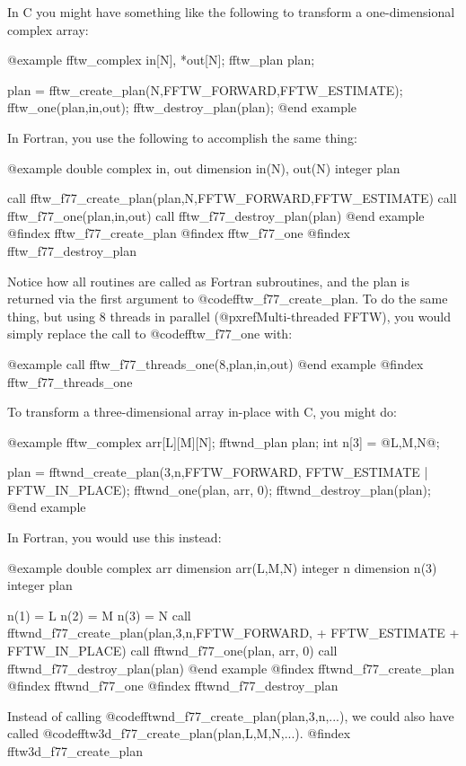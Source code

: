 In C you might have something like the following to transform a
one-dimensional complex array:

@example
        fftw_complex in[N], *out[N];
        fftw_plan plan;

        plan = fftw_create_plan(N,FFTW_FORWARD,FFTW_ESTIMATE);
        fftw_one(plan,in,out);
        fftw_destroy_plan(plan);
@end example

In Fortran, you use the following to accomplish the same thing:

@example
        double complex in, out
        dimension in(N), out(N)
        integer plan

        call fftw_f77_create_plan(plan,N,FFTW_FORWARD,FFTW_ESTIMATE)
        call fftw_f77_one(plan,in,out)
        call fftw_f77_destroy_plan(plan)
@end example
@findex fftw_f77_create_plan
@findex fftw_f77_one
@findex fftw_f77_destroy_plan

Notice how all routines are called as Fortran subroutines, and the plan
is returned via the first argument to @code{fftw_f77_create_plan}.  To
do the same thing, but using 8 threads in parallel
(@pxref{Multi-threaded FFTW}), you would simply replace the call to
@code{fftw_f77_one} with:

@example
        call fftw_f77_threads_one(8,plan,in,out)
@end example
@findex fftw_f77_threads_one

To transform a three-dimensional array in-place with C, you might do:

@example
        fftw_complex arr[L][M][N];
        fftwnd_plan plan;
        int n[3] = @{L,M,N@};

        plan = fftwnd_create_plan(3,n,FFTW_FORWARD,
                                  FFTW_ESTIMATE | FFTW_IN_PLACE);
        fftwnd_one(plan, arr, 0);
        fftwnd_destroy_plan(plan);
@end example

In Fortran, you would use this instead:

@example
        double complex arr
        dimension arr(L,M,N)
        integer n
        dimension n(3)
        integer plan

        n(1) = L
        n(2) = M
        n(3) = N
        call fftwnd_f77_create_plan(plan,3,n,FFTW_FORWARD,
       +                            FFTW_ESTIMATE + FFTW_IN_PLACE)
        call fftwnd_f77_one(plan, arr, 0)
        call fftwnd_f77_destroy_plan(plan)
@end example
@findex fftwnd_f77_create_plan
@findex fftwnd_f77_one
@findex fftwnd_f77_destroy_plan

Instead of calling @code{fftwnd_f77_create_plan(plan,3,n,...)}, we could
also have called @code{fftw3d_f77_create_plan(plan,L,M,N,...)}.
@findex fftw3d_f77_create_plan

